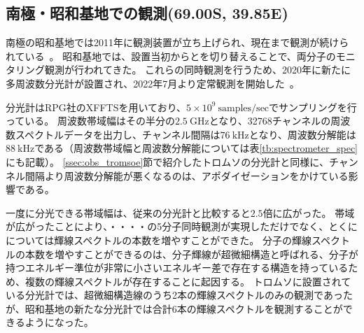 \subsection{南極・昭和基地での観測(69.00\textdegree S, 39.85\textdegree E)}
\label{ssec:obs_syowa}
南極の昭和基地では2011年に観測装置が立ち上げられ、現在まで観測が続けられている~\cite{isono2014variations,isono2014ground}。
昭和基地では、設置当初からとを切り替えることで、両分子のモニタリング観測が行われてきた。
これらの同時観測を行うため、2020年に新たに多周波数分光計が設置され、2022年7月より定常観測を開始した~\cite{iwata2019master,kosegaki2020master,nakajima2020waveguide,sakuma2023superconducting}。\par

分光計はRPG社のXFFTSを用いており、$5\times 10^9\ \mathrm{samples/sec}$でサンプリングを行っている。
周波数帯域幅はその半分の$2.5\ \mathrm{GHz}$となり、32768チャンネルの周波数スペクトルデータを出力し、チャンネル間隔は$76\ \mathrm{kHz}$となり、周波数分解能は$88\ \mathrm{kHz}$である（周波数帯域幅と周波数分解能については表\ref{tb:spectrometer_spec}にも記載）。
\ref{ssec:obs_tromsoe}節で紹介したトロムソの分光計と同様に、チャンネル間隔より周波数分解能が悪くなるのは、アポダイゼーションをかけている影響である。\par

一度に分光できる帯域幅は、従来の分光計と比較すると$2.5$倍に広がった。
帯域が広がったことにより、・・・・の5分子同時観測が実現しただけでなく、とくにについては輝線スペクトルの本数を増やすことができた。
分子の輝線スペクトルの本数を増やすことができるのは、分子輝線が超微細構造と呼ばれる、分子が持つエネルギー準位が非常に小さいエネルギー差で存在する構造を持っているため、複数の輝線スペクトルが存在することに起因する。
トロムソに設置されている分光計では、超微細構造線のうち2本の輝線スペクトルのみの観測であったが、昭和基地の新たな分光計では合計6本の輝線スペクトルを観測することができるようになった。\par

